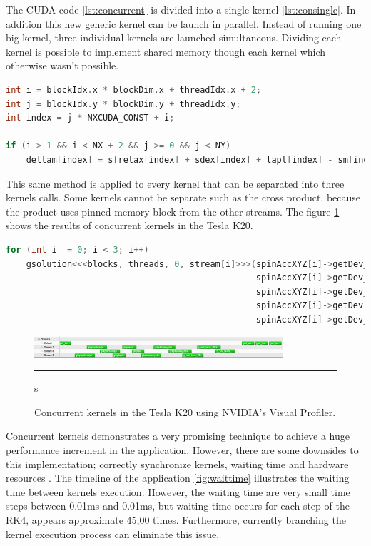 The CUDA code \ref{lst:concurrent} is divided into a single kernel \ref{lst:consingle}. In addition this new generic kernel can be launch in parallel. Instead of running one big kernel, three individual kernels are launched simultaneous. Dividing each kernel is possible to implement shared memory though each kernel which otherwise wasn't possible. 

\begin{lstlisting}[language=C++, label={lst:consingle}, caption={Evaluation of individual coordinates of the Zhang and Li model}]
int i = blockIdx.x * blockDim.x + threadIdx.x + 2;
int j = blockIdx.y * blockDim.y + threadIdx.y;
int index = j * NXCUDA_CONST + i;

if (i > 1 && i < NX + 2 && j >= 0 && j < NY)
	deltam[index] = sfrelax[index] + sdex[index] + lapl[index] - sm[index];
\end{lstlisting}

This same method is applied to every kernel that can be separated into three kernels calls. Some kernels cannot be separate such as the cross product, because the product uses pinned memory block from the other streams.  The figure \ref{fig:concurrent} shows the results of concurrent kernels in the Tesla K20.

\begin{lstlisting}[language=C++, caption={Evaluate Zhang and Li model.}]
for (int i  = 0; i < 3; i++)
	gsolution<<<blocks, threads, 0, stream[i]>>>(spinAccXYZ[i]->getDev_deltam(),
												 spinAccXYZ[i]->getDev_sfrelax(), 
												 spinAccXYZ[i]->getDev_sm(), 
											 	 spinAccXYZ[i]->getDev_sdex(),
											 	 spinAccXYZ[i]->getDev_lapl());
\end{lstlisting}

\begin{figure}[htbp]
	\centering
		\includegraphics[width=0.82\textwidth]{Figures/concurent.png}
		\rule{35em}{0.2pt}s
	\caption[Streams kernels Tesla K20]{Concurrent kernels in the Tesla K20 using NVIDIA's Visual Profiler.}
	\label{fig:concurrent}
\end{figure}

Concurrent kernels demonstrates a very promising technique to achieve a huge performance increment in the application. However, there are some downsides to this implementation; correctly synchronize kernels, waiting time and hardware resources \cite{practices}. The timeline of the application \ref{fig:waittime} illustrates the waiting time between kernels execution. However, the waiting time are very small time steps between 0.01ms and 0.01ms, but waiting time occurs for each step of the RK4, appears approximate 45,00 times. Furthermore, currently branching the kernel execution process can eliminate this issue.


